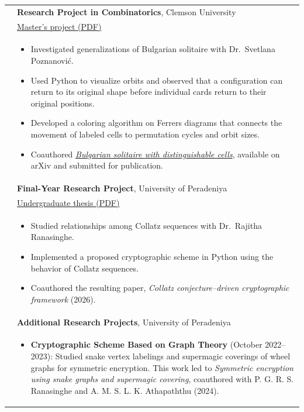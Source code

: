 \documentclass[letterpaper,11pt]{article}
\newcommand{\PreprintURL}{https://arxiv.org/pdf/2611.10437}
\newcommand{\MastersProjectURL}{https://vikumvbandara.github.io/papers/masters-project.pdf}
\newcommand{\UndergraduateThesisURL}{https://vikumvbandara.github.io/papers/undergraduate-thesis.pdf}
\newcommand{\cvspace}{\noalign{\vskip 6pt}}
\begin{document}
\begin{longtable}[t]{@{}>{\raggedright\arraybackslash}p{1.3in}>{\raggedright\arraybackslash}p{4.8in}@{}}
\textbf{\color{OliveGreen}{Research}}
& \textbf{Research Project in Combinatorics}, Clemson University \\*
& \href{\MastersProjectURL}{Master's project (PDF)} \\*
& \begin{itemize}
    \item Investigated generalizations of Bulgarian solitaire with
    Dr.\ Svetlana Poznanovi\'{c}.
    \item Used Python to visualize orbits and observed that a configuration
    can return to its original shape before individual cards return to
    their original positions.
    \item Developed a coloring algorithm on Ferrers diagrams that connects
    the movement of labeled cells to permutation cycles and orbit sizes.
    \item Coauthored
    \href{\PreprintURL}{\emph{Bulgarian solitaire with distinguishable cells}},
    available on arXiv and submitted for publication.
\end{itemize} \\
\cvspace

& \textbf{Final-Year Research Project}, University of Peradeniya \\*
& \href{\UndergraduateThesisURL}{Undergraduate thesis (PDF)} \\*
& \begin{itemize}
    \item Studied relationships among Collatz sequences with
    Dr.\ Rajitha Ranasinghe.
    \item Implemented a proposed cryptographic scheme in Python
    using the behavior of Collatz sequences.
    \item Coauthored the resulting paper,
    \emph{Collatz conjecture--driven cryptographic framework} (2026).
\end{itemize} \\
\cvspace

& \textbf{Additional Research Projects}, University of Peradeniya \\*
& \begin{itemize}
    \item \textbf{Cryptographic Scheme Based on Graph Theory}
    (October 2022--2023): Studied snake vertex labelings and supermagic
    coverings of wheel graphs for symmetric encryption. This work led to
    \emph{Symmetric encryption using snake graphs and supermagic covering},
    coauthored with P. G. R. S. Ranasinghe and
    A. M. S. L. K. Athapaththu (2024).


\end{itemize}
\end{longtable}
\end{document}
